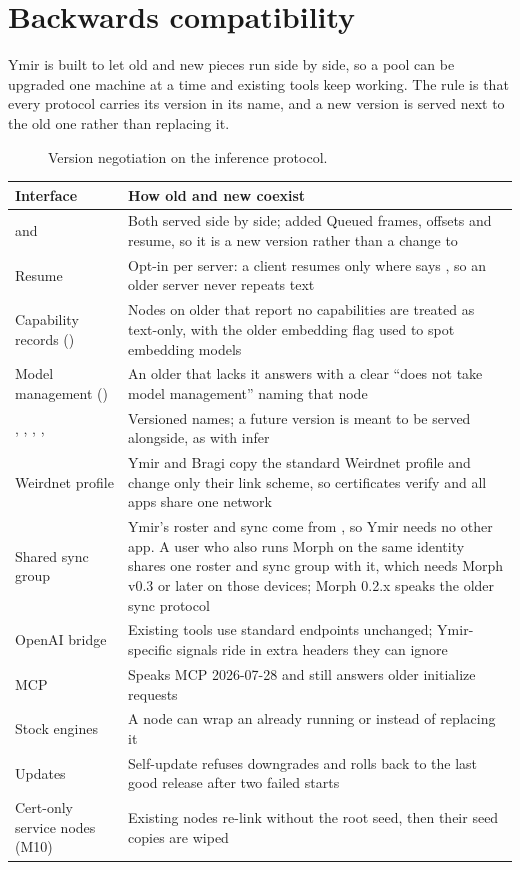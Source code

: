 \section{Backwards compatibility}\label{sec:compat}

Ymir is built to let old and new pieces run side by side, so a pool can be upgraded one machine
at a time and existing tools keep working. The rule is that every protocol carries its version in
its name, and a new version is served next to the old one rather than replacing it.

\begin{figure}[htbp]
\centering
{}
\caption{Version negotiation on the inference protocol.}
\end{figure}

\begin{xltabular}{\linewidth}{@{}L{4.6cm}Y@{}}
\toprule
Interface & How old and new coexist \\
\midrule
\endhead
{} and  & Both served side by side;  added Queued frames, offsets and resume, so it is a new version rather than a change to  \\
Resume & Opt-in per server: a client resumes only where  says , so an older server never repeats text \\
Capability records () & Nodes on older  that report no capabilities are treated as text-only, with the older embedding flag used to spot embedding models \\
Model management () & An older  that lacks it answers with a clear ``does not take model management'' naming that node \\
, , , ,  & Versioned names; a future version is meant to be served alongside, as with infer \\
Weirdnet profile & Ymir and Bragi copy the standard Weirdnet profile and change only their link scheme, so certificates verify and all apps share one network \\
Shared sync group & Ymir's roster and sync come from , so Ymir needs no other app. A user who also runs Morph on the same identity shares one roster and sync group with it, which needs Morph v0.3 or later on those devices; Morph 0.2.x speaks the older sync protocol \\
OpenAI bridge & Existing tools use standard  endpoints unchanged; Ymir-specific signals ride in extra headers they can ignore \\
MCP & Speaks MCP 2026-07-28 and still answers older initialize requests \\
Stock engines & A node can wrap an already running  or  instead of replacing it \\
Updates & Self-update refuses downgrades and rolls back to the last good release after two failed starts \\
Cert-only service nodes (M10) & \planned{} Existing nodes re-link without the root seed, then their seed copies are wiped \\
\bottomrule
\end{xltabular}
